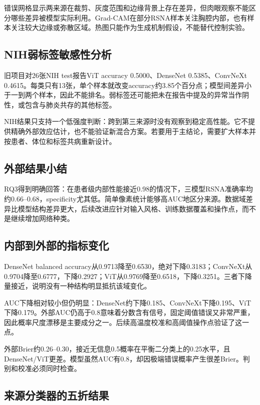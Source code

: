 错误网格显示两来源在裁剪、灰度范围和边缘背景上存在差异，但肉眼观察不能区分哪些差异被模型实际利用。Grad-CAM在部分RSNA样本关注胸腔内部，也有样本关注较大边缘或弥散区域。热图只能作为生成机制假设，不能替代控制实验。

\subsection{NIH弱标签敏感性分析}

旧项目对26张NIH test报告ViT accuracy 0.5000、DenseNet 0.5385、ConvNeXt 0.4615。每类只有13张，单个样本就改变accuracy约3.85个百分点；模型间差异小于一到两个样本，因此不能排名。弱标签还可能把未在报告中提及的异常当作阴性，或包含与肺炎共存的其他标签。

NIH结果只支持一个低强度判断：跨到第三来源时没有观察到稳定高性能。它不提供精确外部效应估计，也不能验证新混合方案。若要用于主结论，需要扩大样本并按患者、体位和标签共病重新设计。

\subsection{外部结果小结}

RQ3得到明确回答：在患者级内部性能接近0.98的情况下，三模型RSNA准确率均约0.66--0.68，specificity尤其低。简单像素统计能够高AUC地区分来源。数据域差异比模型结构差异更大，后续改进应针对输入风格、训练数据覆盖和操作点，而不是继续增加网络种类。

\subsection{内部到外部的指标变化}

DenseNet balanced accuracy从0.9713降至0.6530，绝对下降0.3183；ConvNeXt从0.9704降至0.6777，下降0.2927；ViT从0.9769降至0.6518，下降0.3251。三者下降量接近，说明没有一种结构明显抵抗该域变化。

AUC下降相对较小但仍明显：DenseNet约下降0.185、ConvNeXt下降0.195、ViT下降0.179。外部AUC仍高于0.8意味着分数含有信号，固定阈值错误又非常严重，因此概率尺度漂移是主要成分之一。后续高温度校准和高阈值操作点验证了这一点。

外部Brier约0.26--0.30，接近无信息0.5概率在平衡二分类上的0.25水平，且DenseNet/ViT更差。模型虽然AUC有0.8，却因极端错误概率产生很差Brier。判别和校准必须同时检查。

\subsection{来源分类器的五折结果}

